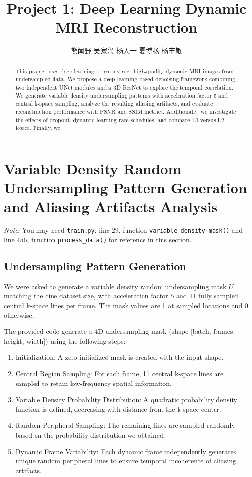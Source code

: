 \documentclass{article}
\title{Project 1: Deep Learning Dynamic MRI Reconstruction}
\author{
  熊闻野
  \And
  吴家兴
  \And
  杨人一
  \And
  夏博扬
  \And
  杨丰敏
}
\begin{document}
\maketitle

\begin{abstract}
This project uses deep learning to reconstruct high-quality dynamic MRI images 
from undersampled data. We propose a deep-learning-based denoising framework combining 
two independent UNet modules and a 3D ResNet to explore the temporal correlation. 
We generate variable density undersampling patterns with acceleration factor 5 and 
central k-space sampling, analyze the resulting aliasing artifacts, and evaluate 
reconstruction performance with PSNR and SSIM metrics. Additionally, 
we investigate the effects of dropout, dynamic learning rate schedules, 
and compare L1 versus L2 losses. Finally, we %
\end{abstract}

\section{Variable Density Random Undersampling Pattern Generation and Aliasing Artifacts Analysis}
\textit{Note: }You may need \texttt{train.py}, line 29, function \texttt{variable\_density\_mask()} 
and line 456, function \texttt{process\_data()} for reference in this section.

\subsection{Undersampling Pattern Generation}
We were asked to generate a variable density random undersampling mask $U$ matching the cine 
dataset size, with acceleration factor 5 and 11 fully sampled central k-space lines per frame. 
The mask values are 1 at sampled locations and 0 otherwise. 

The provided code generate a 4D undersampling mask (shape [batch, frames, height, width]) using the following steps:
\begin{enumerate}
  \item Initialization: A zero-initialized mask is created with the input shape.
  \item Central Region Sampling: For each frame, 11 central k-space lines are 
    sampled to retain low-frequency spatial information.
  \item Variable Density Probability Distribution: A quadratic probability density
    function is defined, decreasing with distance from the k-space center.
  \item Random Peripheral Sampling: The remaining lines are sampled randomly
    based on the probability distribution we obtained.
  \item Dynamic Frame Variability: Each dynamic frame independently generates 
  unique random peripheral lines to ensure temporal incoherence of aliasing artifacts.
\end{enumerate}
\end{document}
